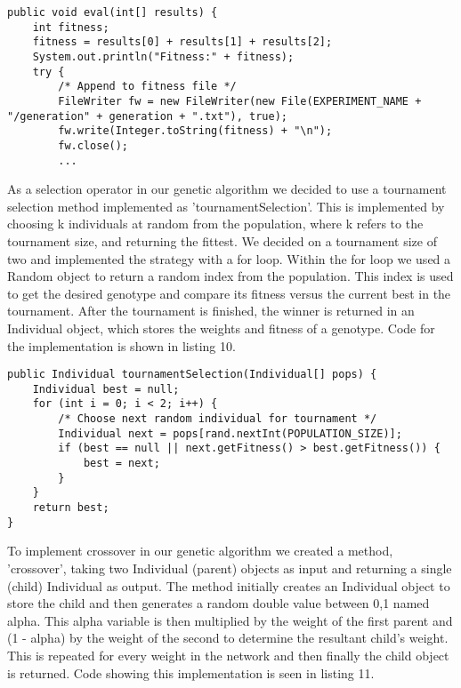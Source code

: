 \documentclass[12pt,a4paper]{article}
\begin{document}
\singlespacing
\begin{lstlisting}[caption=Excerpt of eval method in the GeneticAlgorithm class]
public void eval(int[] results) {
	int fitness;
	fitness = results[0] + results[1] + results[2];
	System.out.println("Fitness:" + fitness);
	try {
		/* Append to fitness file */
		FileWriter fw = new FileWriter(new File(EXPERIMENT_NAME + "/generation" + generation + ".txt"), true);
		fw.write(Integer.toString(fitness) + "\n");
		fw.close();
		...
\end{lstlisting}
\onehalfspace

\newpage
As a selection operator in our genetic algorithm we decided to use a tournament selection method implemented as 'tournamentSelection'. This is implemented by choosing k individuals at random from the population, where k refers to the tournament size, and returning the fittest. We decided on a tournament size of two and implemented the strategy with a for loop. Within the for loop we used a Random object to return a random index from the population. This index is used to get the desired genotype and compare its fitness versus the current best in the tournament. After the tournament is finished, the winner is returned in an Individual object, which stores the weights and fitness of a genotype. Code for the implementation is shown in listing 10.

\singlespacing
\begin{lstlisting}[caption=Implementation of tournament style selection]
public Individual tournamentSelection(Individual[] pops) {
	Individual best = null;
	for (int i = 0; i < 2; i++) {
		/* Choose next random individual for tournament */
		Individual next = pops[rand.nextInt(POPULATION_SIZE)];
		if (best == null || next.getFitness() > best.getFitness()) {
			best = next;
		}
	}
	return best;
}
\end{lstlisting}
\onehalfspace
\vspace{3mm}

To implement crossover in our genetic algorithm we created a method, 'crossover', taking two Individual (parent) objects as input and returning a single (child) Individual as output. The method initially creates an Individual object to store the child and then generates a random double value between 0,1 named alpha. This alpha variable is then multiplied by the weight of the first parent and (1 - alpha) by the weight of the second to determine the resultant child's weight. This is repeated for every weight in the network and then finally the child object is returned. Code showing this implementation is seen in listing 11.
\end{document}
